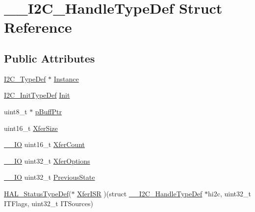 \hypertarget{struct_____i2_c___handle_type_def}{}\section{\+\_\+\+\_\+\+I2\+C\+\_\+\+Handle\+Type\+Def Struct Reference}
\label{struct_____i2_c___handle_type_def}
\subsection*{Public Attributes}
\begin{DoxyCompactItemize}
\item 
\mbox{\hyperlink{struct_i2_c___type_def}{I2\+C\+\_\+\+Type\+Def}} $\ast$ \mbox{\hyperlink{struct_____i2_c___handle_type_def_a080380e6051dd88c3a88c24aad4b10c0}{Instance}}
\item 
\mbox{\hyperlink{struct_i2_c___init_type_def}{I2\+C\+\_\+\+Init\+Type\+Def}} \mbox{\hyperlink{struct_____i2_c___handle_type_def_a8e665bc833889975a33b10bebeab5db2}{Init}}
\item 
uint8\+\_\+t $\ast$ \mbox{\hyperlink{struct_____i2_c___handle_type_def_af699cc26b19f28b9215d3d4a167f068e}{p\+Buff\+Ptr}}
\item 
uint16\+\_\+t \mbox{\hyperlink{struct_____i2_c___handle_type_def_a1b8a62241b4c22d97af542186cef0c39}{Xfer\+Size}}
\item 
\mbox{\hyperlink{core__sc300_8h_aec43007d9998a0a0e01faede4133d6be}{\+\_\+\+\_\+\+IO}} uint16\+\_\+t \mbox{\hyperlink{struct_____i2_c___handle_type_def_a314305a14bb912531cfc3c5f87291777}{Xfer\+Count}}
\item 
\mbox{\hyperlink{core__sc300_8h_aec43007d9998a0a0e01faede4133d6be}{\+\_\+\+\_\+\+IO}} uint32\+\_\+t \mbox{\hyperlink{struct_____i2_c___handle_type_def_a5d3ace2bbb83f44d4fe3df47fa42bb90}{Xfer\+Options}}
\item 
\mbox{\hyperlink{core__sc300_8h_aec43007d9998a0a0e01faede4133d6be}{\+\_\+\+\_\+\+IO}} uint32\+\_\+t \mbox{\hyperlink{struct_____i2_c___handle_type_def_a028d3e824c01ccc6c9a23bb5802e3313}{Previous\+State}}
\item 
\mbox{\hyperlink{stm32f7xx__hal__def_8h_a63c0679d1cb8b8c684fbb0632743478f}{H\+A\+L\+\_\+\+Status\+Type\+Def}}($\ast$ \mbox{\hyperlink{struct_____i2_c___handle_type_def_a27f4f768395d68659c29ba55727182a2}{Xfer\+I\+SR}} )(struct \mbox{\hyperlink{struct_____i2_c___handle_type_def}{\+\_\+\+\_\+\+I2\+C\+\_\+\+Handle\+Type\+Def}} $\ast$hi2c, uint32\+\_\+t I\+T\+Flags, uint32\+\_\+t I\+T\+Sources)
\item 

\end{DoxyCompactItemize}
